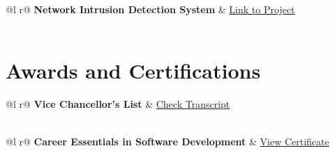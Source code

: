 \documentclass[a4paper,12pt]{article}
\begin{document}
\begin{tabularx}{\linewidth}{ @{}l r@{} }
    \textbf{Network Intrusion Detection System} & \hfill \href{https://github.com/thisisarnabdas/Aegis}{Link to Project}                                                                                                                                                                                                                                                        \\[3.75pt]
     \\
\end{tabularx}

\section{Awards and Certifications}

\begin{tabularx}{\linewidth}{ @{}l r@{} }
	\textbf{Vice Chancellor's List} & \hfill \href{https://drive.google.com/file/d/1nbuqsdivnm6_zClHqRlCCjtDt9-Hk91V/view?usp=sharing}{Check Transcript} \\[3.75pt]
	 \\
\end{tabularx}

\begin{tabularx}{\linewidth}{ @{}l r@{} }
    \textbf{Career Essentials in Software Development} & \hfill \href{https://www.linkedin.com/learning/certificates/b47ab2e721fb8ba120d27288096edeca25ef7cfba7b85efdbd84445d1ec05b55}{View Certificate} \\[3.75pt]
                                                                                                                                                \\
\end{tabularx}
\end{document}
